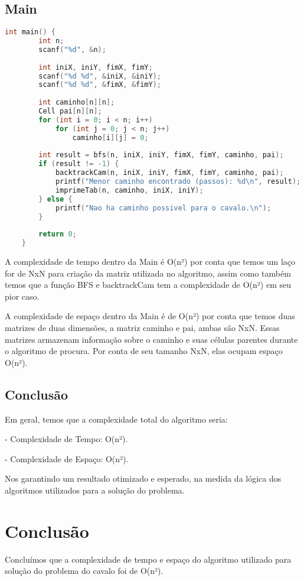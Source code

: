 \documentclass[relatorio]{IEEEtran}
\begin{document}
\subsection{Main}
\begin{lstlisting}[language=C]
    int main() {
        int n;
        scanf("%d", &n);
    
        int iniX, iniY, fimX, fimY;
        scanf("%d %d", &iniX, &iniY);
        scanf("%d %d", &fimX, &fimY);
    
        int caminho[n][n];
        Cell pai[n][n];
        for (int i = 0; i < n; i++)
            for (int j = 0; j < n; j++)
                caminho[i][j] = 0;
    
        int result = bfs(n, iniX, iniY, fimX, fimY, caminho, pai);
        if (result != -1) {
            backtrackCam(n, iniX, iniY, fimX, fimY, caminho, pai);
            printf("Menor caminho encontrado (passos): %d\n", result);
            imprimeTab(n, caminho, iniX, iniY);
        } else {
            printf("Nao ha caminho possivel para o cavalo.\n");
        }
    
        return 0;
    }      
\end{lstlisting}

A complexidade de tempo dentro da Main é O(n²) por conta que temos um laço for de NxN para criação da matriz utilizada no algoritmo, assim como também temos que a função BFS e backtrackCam tem a complexidade de O(n²) em seu pior caso. 

A complexidade de espaço dentro da Main é de O(n²) por conta que temos duas matrizes de duas dimensões, a matriz caminho e pai, ambas são NxN. Essas matrizes armazenam informação sobre o caminho e suas células parentes durante o algoritmo de procura. Por conta de seu tamanho NxN, elas ocupam espaço O(n²).

\subsection{Conclusão}
Em geral, temos que a complexidade total do algoritmo seria:

- Complexidade de Tempo: O(n²).

- Complexidade de Espaço: O(n²).

Nos garantindo um resultado otimizado e esperado, na medida da lógica dos algoritmos utilizados para a solução do problema.



\section{Conclusão}
Concluímos que a complexidade de tempo e espaço do algoritmo utilizado para solução do problema do cavalo foi de O(n²). 
\end{document}
